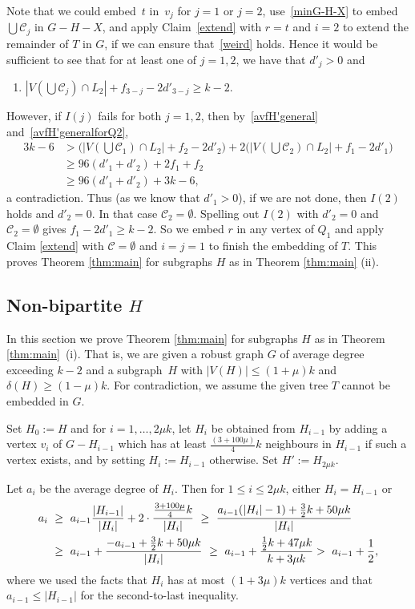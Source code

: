 \documentclass[12pt]{article}
\begin{document}
Note that we could embed~$t$ in~$v_j$ for $j=1$ or $j=2$, 
 use~\eqref{minG-H-X} to embed $\bigcup\mathcal C_j$ in $G-H-X$, and apply Claim~\ref{extend} with $r=t$ and $i=2$ to extend the remainder  of $T$ in $G$, if we can ensure that~\eqref{weird} holds. Hence it would be sufficient to  see that   for at least one of $j=1,2$, we have that $d'_j>0$ and 
 \begin{enumerate}
     \item[{\bf I(j):}] $|V(\bigcup\mathcal C_j)\cap L_2|+f_{3-j}-2 d'_{3-j}\ge k-2$.
 \end{enumerate}
However, if $I(j)$ fails for both $j=1,2$, then by~\eqref{avfH'general} and~\eqref{avfH'generalforQ2},
 \begin{align*}
  3k-6 
  & >\Big(|V(\bigcup\mathcal C_1)\cap L_2|+f_{2}-2 d'_{2}\Big)+2\Big(|V(\bigcup\mathcal C_2)\cap L_2|+f_{1}-2 d'_{1}\Big)
    \\
    & \ge 96 (d'_1+d'_2)+2f_1+f_2
     \\
    & \ge 96 (d'_1+d'_2)+3k-6,
 \end{align*}
 a contradiction. 
 Thus (as we know that $d'_1>0$),  if we are not done, then $I(2)$ holds and $d'_2=0$. In that case $\mathcal C_2=\emptyset$. Spelling out $I(2)$ with $d'_2=0$ and $\mathcal C_2=\emptyset$ gives 
 $f_{1}-2 d'_{1}\ge k-2$. So we embed $r$ in any vertex of $Q_1$ and  apply Claim \ref{extend} with $\mathcal C=\emptyset$ and $i=j=1$ to finish the embedding of $T$. 
 This proves Theorem \ref{thm:main} for subgraphs $H$ as in Theorem \ref{thm:main} (ii).

 
\subsection{Non-bipartite $H$}

In this section we prove Theorem \ref{thm:main} for subgraphs $H$ as in Theorem \ref{thm:main}~(i). That is, we are given a robust graph $G$ of average degree exceeding $k-2$ and a subgraph~$H$ with $|V(H)|
    \le (1+\mu)k$ and $\delta(H)\ge (1-\mu)k$. For contradiction, we assume the given tree $T$ cannot be embedded in $G$.
    
Set $H_0:=H$ and for $i=1,\ldots ,2\mu k$, let $H_i$ be obtained from $H_{i-1}$ by adding a vertex $v_i$ of $G-H_{i-1}$ which  has at least $\frac{(3+100\mu)}{4}k$ neighbours in $H_{i-1}$ if such a vertex exists, and by setting $H_i:=H_{i-1}$ otherwise. Set $H':=H_{2\mu k}$.

Let $a_i$ be the average degree of $H_i$. Then for $1\le i\le 2\mu k$, either $H_i=H_{i-1}$ or 
\begin{align}
a_i\ & \ge \ a_{i-1}\frac{|H_{i-1}|}{|H_i|}+ 2\cdot \frac{\frac{3+100\mu}4 k}{|H_i|}\ \ge \
\frac{a_{i-1}(|H_{i}|-1)+\frac 32 k+50\mu k}{|H_{i}|}  \notag  \\
&
\ge \ a_{i-1}+
\frac{-a_{i-1}+\frac 32 k+50\mu k}{|H_{i}|}
\ \ge \
a_{i-1}+
\frac{\frac 12 k+47\mu k}{k+3\mu k}    > \ a_{i-1}+\frac 12, \label{increase}
\end{align}
   where we used the facts that $H_i$ has at most $(1+3\mu)k$ vertices and that $a_{i-1}\le |H_{i-1}|$ for the second-to-last inequality.
\end{document}
